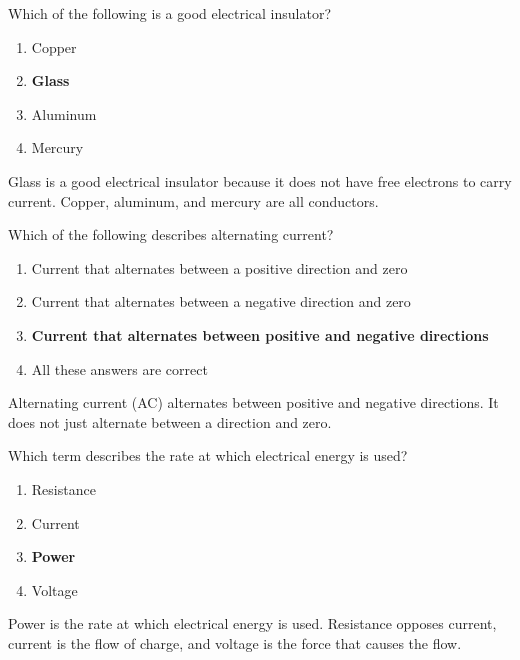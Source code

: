 \begin{tcolorbox}[colback=gray!10!white,colframe=black!75!black,title={T5A08}]
    Which of the following is a good electrical insulator?
    \begin{enumerate}[label=\Alph*),noitemsep]
        \item Copper
        \item \textbf{Glass}
        \item Aluminum
        \item Mercury
    \end{enumerate}
\end{tcolorbox}
Glass is a good electrical insulator because it does not have free electrons to carry current. Copper, aluminum, and mercury are all conductors.

\begin{tcolorbox}[colback=gray!10!white,colframe=black!75!black,title={T5A09}]
    Which of the following describes alternating current?
    \begin{enumerate}[label=\Alph*),noitemsep]
        \item Current that alternates between a positive direction and zero
        \item Current that alternates between a negative direction and zero
        \item \textbf{Current that alternates between positive and negative directions}
        \item All these answers are correct
    \end{enumerate}
\end{tcolorbox}
Alternating current (AC) alternates between positive and negative directions. It does not just alternate between a direction and zero.

\begin{tcolorbox}[colback=gray!10!white,colframe=black!75!black,title={T5A10}]
    Which term describes the rate at which electrical energy is used?
    \begin{enumerate}[label=\Alph*),noitemsep]
        \item Resistance
        \item Current
        \item \textbf{Power}
        \item Voltage
    \end{enumerate}
\end{tcolorbox}
Power is the rate at which electrical energy is used. Resistance opposes current, current is the flow of charge, and voltage is the force that causes the flow.

